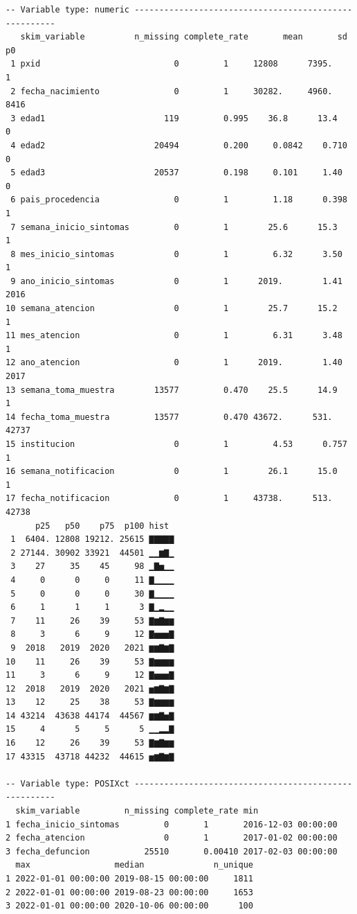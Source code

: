 \documentclass[
  letterpaper,
  DIV=11,
  numbers=noendperiod]{scrreprt}
\begin{document}
\begin{verbatim}
-- Variable type: numeric ------------------------------------------------------
   skim_variable          n_missing complete_rate       mean       sd    p0
 1 pxid                           0         1     12808      7395.        1
 2 fecha_nacimiento               0         1     30282.     4960.     8416
 3 edad1                        119         0.995    36.8      13.4       0
 4 edad2                      20494         0.200     0.0842    0.710     0
 5 edad3                      20537         0.198     0.101     1.40      0
 6 pais_procedencia               0         1         1.18      0.398     1
 7 semana_inicio_sintomas         0         1        25.6      15.3       1
 8 mes_inicio_sintomas            0         1         6.32      3.50      1
 9 ano_inicio_sintomas            0         1      2019.        1.41   2016
10 semana_atencion                0         1        25.7      15.2       1
11 mes_atencion                   0         1         6.31      3.48      1
12 ano_atencion                   0         1      2019.        1.40   2017
13 semana_toma_muestra        13577         0.470    25.5      14.9       1
14 fecha_toma_muestra         13577         0.470 43672.      531.    42737
15 institucion                    0         1         4.53      0.757     1
16 semana_notificacion            0         1        26.1      15.0       1
17 fecha_notificacion             0         1     43738.      513.    42738
      p25   p50    p75  p100 hist 
 1  6404. 12808 19212. 25615 ▇▇▇▇▇
 2 27144. 30902 33921  44501 ▁▁▆▇▁
 3    27     35    45     98 ▁▇▅▁▁
 4     0      0     0     11 ▇▁▁▁▁
 5     0      0     0     30 ▇▁▁▁▁
 6     1      1     1      3 ▇▁▂▁▁
 7    11     26    39     53 ▇▆▇▆▆
 8     3      6     9     12 ▇▅▅▅▇
 9  2018   2019  2020   2021 ▆▆▇▆▇
10    11     26    39     53 ▇▆▆▆▆
11     3      6     9     12 ▇▅▅▅▇
12  2018   2019  2020   2021 ▅▆▇▆▇
13    12     25    38     53 ▇▆▆▆▆
14 43214  43638 44174  44567 ▆▆▇▅▇
15     4      5     5      5 ▁▁▂▂▇
16    12     26    39     53 ▇▆▇▆▆
17 43315  43718 44232  44615 ▅▆▇▆▇

-- Variable type: POSIXct ------------------------------------------------------
  skim_variable         n_missing complete_rate min                
1 fecha_inicio_sintomas         0       1       2016-12-03 00:00:00
2 fecha_atencion                0       1       2017-01-02 00:00:00
3 fecha_defuncion           25510       0.00410 2017-02-03 00:00:00
  max                 median              n_unique
1 2022-01-01 00:00:00 2019-08-15 00:00:00     1811
2 2022-01-01 00:00:00 2019-08-23 00:00:00     1653
3 2022-01-01 00:00:00 2020-10-06 00:00:00      100
\end{verbatim}
\end{document}
